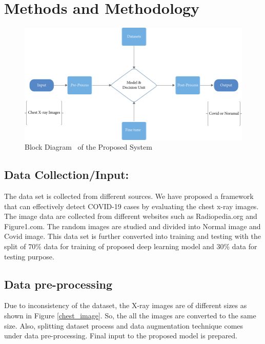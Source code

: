 \section{Methods and Methodology}

\begin{figure}[!h]
    \centering
        \includegraphics{assets/block.png}
    \caption{Block Diagram~\cite{Uddin2021} of the Proposed System}
\end{figure}

\subsection{Data Collection/Input:}

The data set is collected from different sources. We have proposed a framework that can effectively detect COVID-19 cases by evaluating the chest x-ray images. The image data are collected from different websites such as Radiopedia.org and Figure1.com. The random images are studied and divided into Normal image and Covid image. This data set is further converted into training and testing with the split of 70\% data for training of proposed deep learning model and 30\% data for testing purpose. 

\subsection{Data pre-processing }

Due to inconsistency of the dataset, the X-ray images are of different sizes as shown in Figure \ref{chest_image}. So, the all the images are converted to the same size. Also, splitting dataset process and data augmentation technique comes under data pre-processing. Final input to the proposed model is prepared. 


